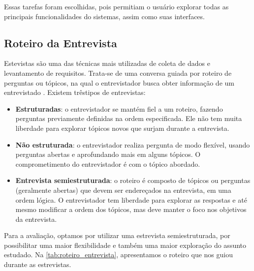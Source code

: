 Essas tarefas foram escolhidas, pois permitiam o usuário explorar todas as principais funcionalidades do sistemas, assim como suas interfaces. 

\subsection{Roteiro da Entrevista}
Estevistas são uma das técnicas mais utilizadas de coleta de dados e levantamento de requisitos. Trata-se de uma conversa guiada por roteiro de perguntas ou tópicos, na qual o entrevistador busca obter informação de um entrevistado \cite{seidman1998interview}. Existem trêstipos de entrevistas:
\begin{itemize}
	\item \textbf{Estruturadas}: o entrevistador se mantém fiel a um roteiro, fazendo perguntas previamente definidas na ordem especificada. Ele não tem muita liberdade para explorar tópicos novos que surjam durante a entrevista.
	\item \textbf{Não estruturada}:  o entrevistador realiza pergunta de modo flexível, usando perguntas abertas e aprofundando mais em alguns tópicos. O comprometimento do entrevistador é com o tópico abordado.
	\item \textbf{Entrevista semiestruturada}: o roteiro é composto de tópicos ou perguntas (geralmente abertas) que devem ser endereçados na entrevista, em uma ordem lógica. O entrevistador tem liberdade para explorar as respostas e até mesmo modificar a ordem dos tópicos, mas deve manter o foco nos objetivos da entrevista. 
\end{itemize}

Para a avaliação, optamos por utilizar uma estrevista semiestruturada,  por possibilitar uma maior flexibilidade e também uma maior exploração do assunto estudado. Na \autoref{tab:roteiro_entrevista}, apresentamos o roteiro que nos guiou durante as estrevistas.


